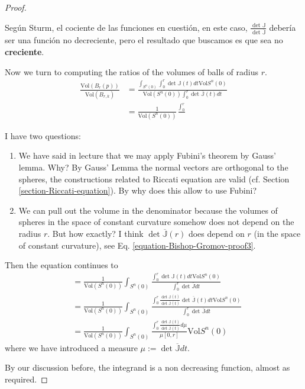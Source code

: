 \begin{proof}
\begin{remark}[Pregunta]
\label{remark-pregunta2}
Según Sturm, el cociente de las funciones en cuestión, en este caso,  
$\frac{\det\mathbb{J}}{\det\overline{\mathbb{J}}}$ debería ser una función no
decreciente, pero el resultado que buscamos es que sea no {\bf creciente}.
\end{remark}
\bigskip
Now we turn to computing the ratios of the volumes of balls of radius $r$. 
\begin{align*}
\frac{\text{Vol}(B_r(p))}{\text{Vol}(B_{r,k})}&=
\frac{\int_{S^n(0)}\int_0^r\det\mathbb{J}(t)dt\text{Vol}S^n(0)}
{\text{Vol}(S^n(0))\int_0^r \det\overline{\mathbb{J}}(t)dt}\\
&=\frac{1}{\text{Vol}(S^n(0))} \frac{\int_0^r}{}
\end{align*}
\begin{remark}[Preguntas]
\label{remark-pregunta3}
I have two questions:
\begin{enumerate}
\item We have said in lecture that we may apply Fubini's theorem by Gauss'
lemma. Why? By Gauss' Lemma the normal vectors are orthogonal to the spheres,
the constructions related to Riccati equation are valid (cf. Section
\ref{section-Riccati-equation}). By why does this allow to use Fubini? 
\item We can pull out the volume in the denominator because the volumes of
spheres in the space of constant curvature somehow does not depend on the radius
 $r$. But how exactly? I think  $\det \overline{\mathbb{J}}(r)$ does depend 
on $r$ (in the space of constant curvature), see Eq. 
\ref{equation-Bishop-Gromov-proof3}.
\end{enumerate}
\end{remark}
Then the equation continues to
\begin{align*}
&=\frac{1}{\text{Vol}(S^n(0))}
\int_{S^n(0)}\frac{\int_0^r \det \mathbb{J}(t)dt \text{Vol}S^n(0)}
{\int_0^r\det\overline{J}dt}\\
&=\frac{1}{\text{Vol}(S^n(0))}
\int_{S^n(0)}\frac{\int_0^r \frac{\det \mathbb{J}(t)}
{\det\overline{\mathbb{J}}(t)}
\det\overline{\mathbb{J}}(t)dt \text{Vol}S^n(0)}
{\int_0^r\det\overline{\mathbb{J}}dt}\\
&=\frac{1}{\text{Vol}(S^n(0))}
\int_{S^n(0)}\frac{\int_0^r \frac{\det \mathbb{J}(t)}
{\det\overline{\mathbb{J}}(t)}d\mu}{\mu[0,r]}\text{Vol}S^n(0)
\end{align*}
where we have introduced a measure 
$\mu:=\det \overline{\mathbb{J}}dt$.

By our discussion before, the integrand is a non decreasing function, almost as
required.


\end{proof}
